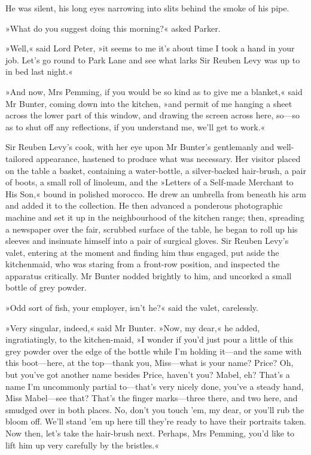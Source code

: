 He was silent, his long eyes narrowing into slits behind the smoke of his pipe.

»What do you suggest doing this morning?« asked Parker.

»Well,« said Lord Peter, »it seems to me it's about time I took a hand in your job. Let's go round to Park Lane and see what larks Sir Reuben Levy was up to in bed last night.«

»And now, Mrs Pemming, if you would be so kind as to give me a blanket,« said Mr Bunter, coming down into the kitchen, »and permit of me hanging a sheet across the lower part of this window, and drawing the screen across here, so—so as to shut off any reflections, if you understand me, we'll get to work.«

Sir Reuben Levy's cook, with her eye upon Mr Bunter's gentlemanly and well-tailored appearance, hastened to produce what was necessary. Her visitor placed on the table a basket, containing a water-bottle, a silver-backed hair-brush, a pair of boots, a small roll of linoleum, and the »Letters of a Self-made Merchant to His Son,« bound in polished morocco. He drew an umbrella from beneath his arm and added it to the collection. He then advanced a ponderous photographic machine and set it up in the neighbourhood of the kitchen range; then, spreading a newspaper over the fair, scrubbed surface of the table, he began to roll up his sleeves and insinuate himself into a pair of surgical gloves. Sir Reuben Levy's valet, entering at the moment and finding him thus engaged, put aside the kitchenmaid, who was staring from a front-row position, and inspected the apparatus critically. Mr Bunter nodded brightly to him, and uncorked a small bottle of grey powder.

»Odd sort of fish, your employer, isn't he?« said the valet, carelessly.

»Very singular, indeed,« said Mr Bunter. »Now, my dear,« he added, ingratiatingly, to the kitchen-maid, »I wonder if you'd just pour a little of this grey powder over the edge of the bottle while I'm holding it—and the same with this boot—here, at the top—thank you, Miss—what is your name? Price? Oh, but you've got another name besides Price, haven't you? Mabel, eh? That's a name I'm uncommonly partial to—that's very nicely done, you've a steady hand, Miss Mabel—see that? That's the finger marks—three there, and two here, and smudged over in both places. No, don't you touch 'em, my dear, or you'll rub the bloom off. We'll stand 'em up here till they're ready to have their portraits taken. Now then, let's take the hair-brush next. Perhaps, Mrs Pemming, you'd like to lift him up very carefully by the bristles.«

